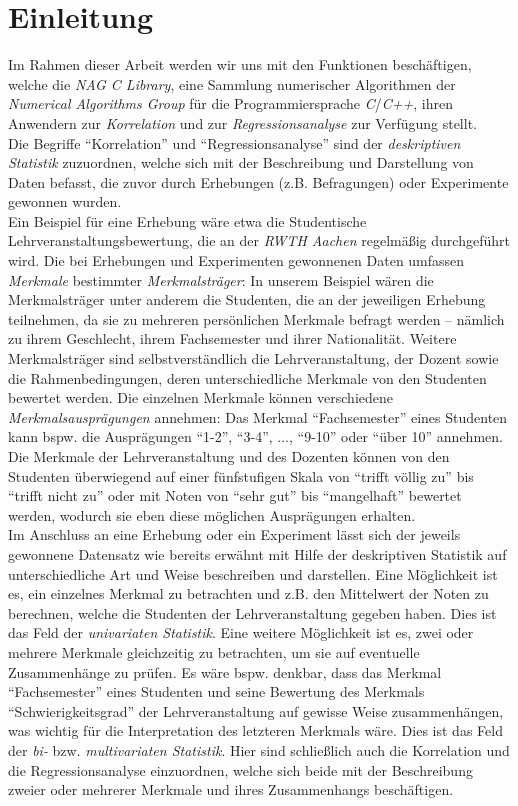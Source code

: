 \section{Einleitung}

Im Rahmen dieser Arbeit werden wir uns mit den Funktionen beschäftigen, welche die {\it NAG C Library}, eine Sammlung numerischer Algorithmen der {\it Numerical Algorithms Group} für die Programmiersprache {\it C}/{\it C++}, ihren Anwendern zur {\it Korrelation} und zur {\it Regressionsanalyse} zur Verfügung stellt.\\
Die Begriffe "`Korrelation"' und "`Regressionsanalyse"' sind der {\it deskriptiven Statistik} zuzuordnen, welche sich mit der Beschreibung und Darstellung von Daten befasst, die zuvor durch Erhebungen (z.B. Befragungen) oder Experimente gewonnen wurden.\\
Ein Beispiel für eine Erhebung wäre etwa die Studentische Lehrveranstaltungsbewertung, die an der {\it RWTH Aachen} regelmäßig durchgeführt wird. Die bei Erhebungen und Experimenten gewonnenen Daten umfassen {\it Merkmale} bestimmter {\it Merkmalsträger}: In unserem Beispiel wären die Merkmalsträger unter anderem die Studenten, die an der jeweiligen Erhebung teilnehmen, da sie zu mehreren persönlichen Merkmale befragt werden -- nämlich zu ihrem Geschlecht, ihrem Fachsemester und ihrer Nationalität. Weitere Merkmalsträger sind selbstverständlich die Lehrveranstaltung, der Dozent sowie die Rahmenbedingungen, deren unterschiedliche Merkmale von den Studenten bewertet werden. Die einzelnen Merkmale können verschiedene {\it Merkmalsausprägungen} annehmen: Das Merkmal "`Fachsemester"' eines Studenten kann bspw. die Ausprägungen "`1-2"', "`3-4"', ..., "`9-10"' oder "`über 10"' annehmen. Die Merkmale der Lehrveranstaltung und des Dozenten können von den Studenten überwiegend auf einer fünfstufigen Skala von "`trifft völlig zu"' bis "`trifft nicht zu"' oder mit Noten von "`sehr gut"' bis "`mangelhaft"' bewertet werden, wodurch sie eben diese möglichen Ausprägungen erhalten.\\
Im Anschluss an eine Erhebung oder ein Experiment lässt sich  der jeweils gewonnene Datensatz wie bereits erwähnt mit Hilfe der deskriptiven Statistik auf unterschiedliche Art und Weise beschreiben und darstellen. Eine Möglichkeit ist es, ein einzelnes Merkmal zu betrachten und z.B. den Mittelwert der Noten zu berechnen, welche die Studenten der Lehrveranstaltung gegeben haben. Dies ist das Feld der {\it univariaten Statistik}. Eine weitere Möglichkeit ist es, zwei oder mehrere Merkmale gleichzeitig zu betrachten, um sie auf eventuelle Zusammenhänge zu prüfen. Es wäre bspw. denkbar, dass das Merkmal "`Fachsemester"' eines Studenten und seine Bewertung des Merkmals "`Schwierigkeitsgrad"' der Lehrveranstaltung auf gewisse Weise zusammenhängen, was wichtig für die Interpretation des letzteren Merkmals wäre. Dies ist das Feld der {\it bi-} bzw. {\it multivariaten Statistik}. Hier sind schließlich auch die Korrelation und die Regressionsanalyse einzuordnen, welche sich beide mit der Beschreibung zweier oder mehrerer Merkmale und ihres Zusammenhangs beschäftigen.

